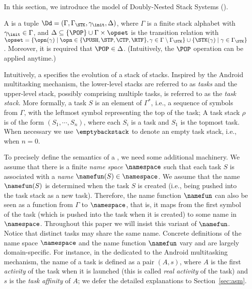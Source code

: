 In this section, we introduce the model of Doubly-Nested Stack Systems (\DNSS).  
\begin{definition} \label{def:eps}
    A {\DNSS} is a tuple $\Dd = (\Gamma,\Gamma_\STK, \gamma_{\init}, \Delta)$, where $\Gamma$ is a finite stack alphabet with $\gamma_\init\in \Gamma$, and $\Delta \subseteq \{\POP\} \cup \Gamma \times \opset$ is the transition relation with 
    $\opset=\{\opn(\gamma)\mid \opn \in \{\PUSH, \STP, \CTP, \RTF\}, \gamma \in \Gamma\setminus\Gamma_\STK \} \cup \{\STK(\gamma)\mid \gamma\in\Gamma_\STK\}$. Moreover, it is required that $\POP \in \Delta$. (Intuitively, the $\POP$ operation can be applied anytime.)
\end{definition}

Intuitively, a {\DNSS} specifies the evolution of a stack of stacks. Inspired by the Android multitasking mechanism, the lower-level stacks are referred to as \emph{tasks} and the upper-level stack, possibly comprising multiple tasks, is referred to as the \emph{task stack}. More formally, a task $S$ is an element of $\Gamma^*$, i.e., a sequence of symbols from $\Gamma$, with the leftmost symbol representing the top of the task; A task stack $\rho$ is of the form $(S_1,\cdots, S_n)$, where each $S_i$ is a task and $S_1$ is the topmost task. When necessary we use $\emptybackstack$ to denote an empty task stack, i.e., when $n=0$.

To precisely define the semantics of a {\DNSS}, we need some additional machinery. We assume that there is a finite \emph{name space} $\namespace$ such that each task $S$ is associated with a \emph{name} $\namefun(S)\in \namespace$. 
%
We assume that the name $\namefun(S)$ is determined when the task $S$ is created (i.e., being pushed into the task stack as a new task). Therefore, the name function $\namefun$ can also be seen as a function from $\Gamma$ to $\namespace$, that is, it maps from the first symbol of the task (which is pushed into the task when it is created) to some name in $\namespace$. 
%
Throughout  this paper we will insist this variant of $\namefun$. 
Notice that distinct tasks may share the same name. Concrete definitions of the name space $\namespace$ and the name function $\namefun$ vary and are largely domain-specific. For instance, in the {\DNSS} dedicated to the Android multitasking mechanism,  the name of a task is defined as a pair $(A, s)$, where $A$ is the first \emph{activity} of the task when it is launched (this is called \emph{real activity} of the task) and $s$ is the \emph{task affinity} of $A$; we defer the detailed explanations to Section~\ref{sec:asm}.  

